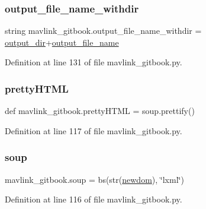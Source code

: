 \subsubsection{\texorpdfstring{output\_file\_name\_withdir}{output\_file\_name\_withdir}}
{\footnotesize\ttfamily string mavlink\+\_\+gitbook.\+output\+\_\+file\+\_\+name\+\_\+withdir = \mbox{\hyperlink{namespacemavlink__gitbook_a038f966b01c8835bbafb0d301aafc036}{output\+\_\+dir}}+\mbox{\hyperlink{namespacemavlink__gitbook_a65b46bdd34434cd895d50866a39e1fc5}{output\+\_\+file\+\_\+name}}}



Definition at line 131 of file mavlink\+\_\+gitbook.\+py.

\mbox{\label{namespacemavlink__gitbook_acbe59884e9f0522fe46d6244b01a4dc6}} 
\subsubsection{\texorpdfstring{prettyHTML}{prettyHTML}}
{\footnotesize\ttfamily def mavlink\+\_\+gitbook.\+pretty\+H\+T\+ML = soup.\+prettify()}



Definition at line 117 of file mavlink\+\_\+gitbook.\+py.

\mbox{\label{namespacemavlink__gitbook_a92e67a31e7a0bf86bd2e071093781f53}} 
\subsubsection{\texorpdfstring{soup}{soup}}
{\footnotesize\ttfamily mavlink\+\_\+gitbook.\+soup = bs(str(\mbox{\hyperlink{namespacemavlink__gitbook_a539be0135e50ed256965d635c039bbdf}{newdom}}), \char`\"{}lxml\char`\"{})}



Definition at line 116 of file mavlink\+\_\+gitbook.\+py.

\mbox{\label{namespacemavlink__gitbook_a3dbbd9ffdef79cdd3d0bc10c5eac95e6}} 
